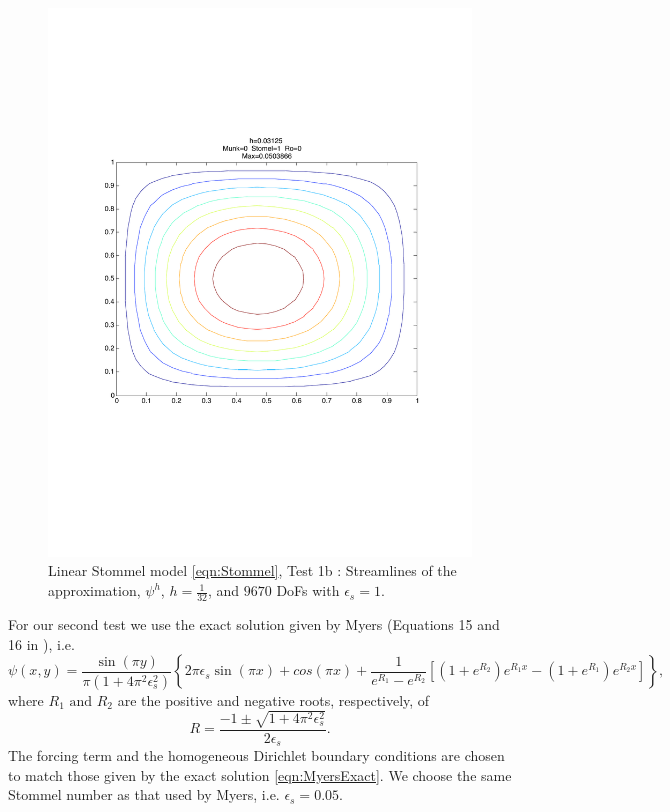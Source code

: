 \begin{figure}%
  \begin{center}
    \includegraphics[scale=0.5]{Figures/StommelVallise1.pdf}
    \caption{Linear Stommel model \eqref{eqn:Stommel}, Test 1b \cite{Vallis06}: Streamlines of the approximation,
    $\psi^h$, $h=\frac{1}{32}$, and $9670$ DoFs with $\epsilon_s=1$.}
    \label{fig:StommelVallise1}
  \end{center}
\end{figure}

For our second test we use the exact solution given by Myers (Equations 15 and
16 in \cite{Myers}), i.e.
{\footnotesize
\begin{equation}
  \psi(x,y) =\frac{\sin(\pi y)}{\pi(1+4\pi^2\epsilon_s^2)}\left\{2\pi\epsilon_s\sin(\pi x)+cos(\pi x)+\frac{1}{e^{R_1}-e^{R_2}}\left[(1+e^{R_2})e^{R_1x}-(1+e^{R_1})e^{R_2x}\right]\right\},
  \label{eqn:MyersExact}
\end{equation}
}
where $R_1\text{ and } R_2$ are the positive and negative roots, respectively,
of
\begin{equation*}
  R = \frac{-1\pm\sqrt{1+4\pi^2 \epsilon_s^2}}{2\epsilon_s}.
\end{equation*}
The forcing term and the homogeneous Dirichlet boundary conditions are chosen to
match those given by the exact solution \eqref{eqn:MyersExact}. We choose the
same Stommel number as that used by Myers, i.e. $\epsilon_s=0.05$.

